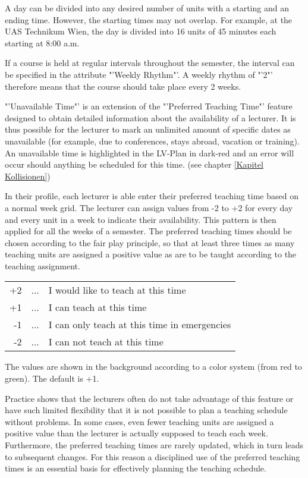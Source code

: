{{	
A day can be divided into any desired number of units with a starting and an ending time. However, the starting times may not overlap.
For example, at the UAS Technikum Wien, the day is divided into 16 units of 45 minutes each starting at 8:00 a.m.

If a course is held at regular intervals throughout the semester, the interval can be specified in the attribute "'Weekly Rhythm"'.
A weekly rhythm of "'2"' therefore means that the course should take place every 2 weeks.

"'Unavailable Time"' is an extension of the "'Preferred Teaching Time"' feature designed to obtain detailed information about the availability of a lecturer.
It is thus possible for the lecturer to mark an unlimited amount of specific dates as unavailable (for example, due to conferences, stays abroad, vacation or training). An unavailable time is highlighted in the LV-Plan in dark-red and an error will occur should anything be scheduled for this time. (see chapter \ref{Kapitel Kollisionen})

In their profile, each lecturer is able enter their preferred teaching time based on a normal week grid. The lecturer can assign values from -2 to +2 for every day and every unit in a week to indicate their availability. This pattern is then applied for all the weeks of a semester.
The preferred teaching times should be chosen according to the fair play principle, so that at least three times as many teaching units are assigned a positive value as are to be taught according to the teaching assignment.

\begin{tabular}{rll}
+2&...&I would like to teach at this time\\
+1&...&I can teach at this time\\
-1&...&I can only teach at this time in emergencies\\
-2&...&I can not teach at this time\\
\end{tabular}

The values are shown in the background according to a color system (from red to green). The default is +1. 

Practice shows that the lecturers often do not take advantage of this feature or have such limited flexibility that it is not possible to plan a teaching schedule without problems. In some cases, even fewer teaching units are assigned a positive value than the lecturer is actually supposed to teach each week.
Furthermore, the preferred teaching times are rarely updated, which in turn leads to subsequent changes.
For this reason a disciplined use of the preferred teaching times is an essential basis for effectively planning the teaching schedule.

}}
